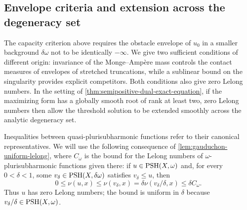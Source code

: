 \subsection{Envelope criteria and extension across the degeneracy set}
\label{subsec:semipositive-envelope-extension}

The capacity criterion above requires the obstacle envelope of $u_0$ in a smaller background $\delta\omega$ not to be identically $-\infty$. We give two sufficient conditions of different origin: invariance of the Monge--Amp\`ere mass controls the contact measures of envelopes of stretched truncations, while a sublinear bound on the singularity provides explicit competitors. Both conditions also give zero Lelong numbers. In the setting of \cref{thm:semipositive-dual-exact-equation}, if the maximizing form has a globally smooth root of rank at least two, zero Lelong numbers then allow the threshold solution to be extended smoothly across the analytic degeneracy set.

Inequalities between quasi-plurisubharmonic functions refer to their canonical representatives. We will use the following consequence of \cref{lem:gauduchon-uniform-lelong}, where $C_\omega$ is the bound for the Lelong numbers of $\omega$-plurisubharmonic functions given there: if $u\in\mathrm{PSH}(X,\omega)$ and, for every $0<\delta<1$, some $v_\delta\in\mathrm{PSH}(X,\delta\omega)$ satisfies $v_\delta\leq u$, then
\[
 0\leq\nu(u,x)\leq\nu(v_\delta,x)
       =\delta\nu(v_\delta/\delta,x)\leq\delta C_\omega.
\]
Thus $u$ has zero Lelong numbers; the bound is uniform in $\delta$ because $v_\delta/\delta\in\mathrm{PSH}(X,\omega)$.

